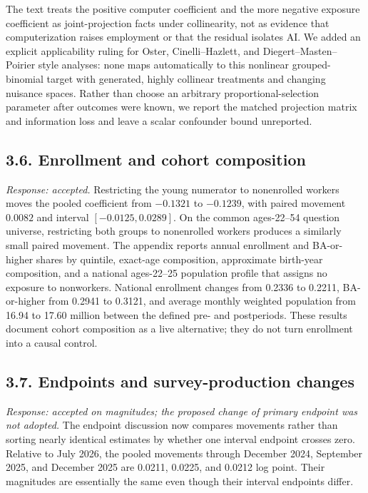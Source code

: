 \documentclass[11pt,letterpaper]{article}
\begin{document}
The text treats the positive computer coefficient and the more negative exposure coefficient as joint-projection facts under collinearity, not as evidence that computerization raises employment or that the residual isolates AI.  We added an explicit applicability ruling for Oster, Cinelli--Hazlett, and Diegert--Masten--Poirier style analyses: none maps automatically to this nonlinear grouped-binomial target with generated, highly collinear treatments and changing nuisance spaces.  Rather than choose an arbitrary proportional-selection parameter after outcomes were known, we report the matched projection matrix and information loss and leave a scalar confounder bound unreported.

\subsection*{3.6. Enrollment and cohort composition}

\emph{Response: accepted.}  Restricting the young numerator to nonenrolled workers moves the pooled coefficient from $-0.1321$ to $-0.1239$, with paired movement $0.0082$ and interval $[-0.0125,0.0289]$.  On the common ages-22--54 question universe, restricting both groups to nonenrolled workers produces a similarly small paired movement.  The appendix reports annual enrollment and BA-or-higher shares by quintile, exact-age composition, approximate birth-year composition, and a national ages-22--25 population profile that assigns no exposure to nonworkers.  National enrollment changes from 0.2336 to 0.2211, BA-or-higher from 0.2941 to 0.3121, and average monthly weighted population from 16.94 to 17.60 million between the defined pre- and postperiods.  These results document cohort composition as a live alternative; they do not turn enrollment into a causal control.

\subsection*{3.7. Endpoints and survey-production changes}

\emph{Response: accepted on magnitudes; the proposed change of primary endpoint was not adopted.}  The endpoint discussion now compares movements rather than sorting nearly identical estimates by whether one interval endpoint crosses zero.  Relative to July 2026, the pooled movements through December 2024, September 2025, and December 2025 are 0.0211, 0.0225, and 0.0212 log point.  Their magnitudes are essentially the same even though their interval endpoints differ.
\end{document}
